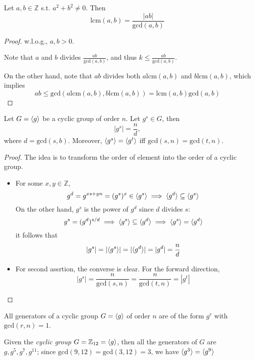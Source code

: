 \begin{theorem}
Let $a,b\in\mathbb{Z}$ s.t. $a^2+b^2\ne0$. Then
\[
\mbox{lcm}(a,b)=\frac{|ab|}{\mbox{gcd}(a,b)}
\]
\end{theorem}
\begin{proof}
w.l.o.g., $a,b>0$.

Note that $a$ and $b$ divides $\frac{ab}{\mbox{gcd}(a,b)}$, and thus $k\le\frac{ab}{\mbox{gcd}(a,b)}$.

On the other hand, note that $ab$ divides both $a\mbox{lcm}(a,b)$ and $b\mbox{lcm}(a,b)$, which implies
\[
ab\le\mbox{gcd}(a\mbox{lcm}(a,b),b\mbox{lcm}(a,b))
=
\mbox{lcm}(a,b)\mbox{gcd}(a,b)
\]
\end{proof}
\begin{proposition}
Let $G=\langle g\rangle$ be a cyclic group of order $n$. Let $g^s\in G$, then
\[
|g^s|=\frac{n}{d},
\]
where $d=\mbox{gcd}(s,b)$. Moreover, $\langle g^s\rangle = \langle g^t\rangle$ iff $\mbox{gcd}(s,n) = \mbox{gcd}(t,n)$.
\end{proposition}
\begin{proof}
The idea is to transform the order of element into the order of a cyclic group.
\begin{itemize}
\item
For some $x,y\in\mathbb{Z}$,
\[
g^d=g^{xs+yn}=(g^{s})^x\in\langle g^s\rangle\implies
\langle g^d\rangle\subseteq\langle g^s\rangle
\]
On the other hand, $g^s$ is the power of $g^d$ since $d$ divides $s$:
\[
g^s = (g^d)^{s/d}\implies
\langle g^s\rangle\subseteq\langle g^d\rangle\implies\langle g^s\rangle = \langle g^d\rangle
\]
it follows that
\[
|g^s| = |\langle g^s\rangle| = |\langle g^d\rangle| = |g^d| = \frac{n}{d}
\]
\item
For second assrtion, the converse is clear. For the forward direction,
\[
|g^s|=\frac{n}{\mbox{gcd}(s,n)}=\frac{n}{\mbox{gcd}(t,n)}=|g^t|
\]
\end{itemize}


\end{proof}

\begin{corollary}
All generators of a cyclic group $G=\langle g\rangle$ of order $n$ are of the form $g^r$ with $\mbox{gcd}(r,n)=1$.
\end{corollary}
\begin{example}
Given the \emph{cyclic group} $G=\mathbb{Z}_{12}=\langle g\rangle$, then all the generators of $G$ are $g,g^5,g^7,g^{11}$; since $\mbox{gcd}(9,12)=\mbox{gcd}(3,12)=3$, we have $\langle g^3\rangle = \langle g^9\rangle$
\end{example}

